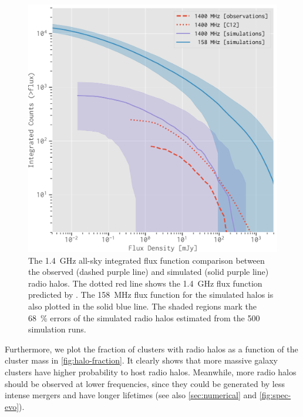 \documentclass[twocolumn]{aastex62}
\newcommand{\editone}[1]{{\leavevmode\color{cyan}#1}}
\begin{document}
\begin{figure}
  \centering
  \includegraphics[width=\columnwidth]{fluxfunc-simucomp}
  \caption{\label{fig:halos-simucomp}%
    The \SI{1.4}{\GHz} all-sky integrated flux function comparison
    between the observed (dashed purple line) and simulated
    (solid purple line) radio halos.
    The dotted red line shows the \SI{1.4}{\GHz} flux function predicted
    by \citet{cassano2012}.
    The \SI{158}{\MHz} flux function for the simulated halos is also
    plotted in the solid blue line.
    The shaded regions mark the \SI{68}{\percent} errors of the
    simulated radio halos estimated from the 500 simulation runs.
  }
\end{figure}

\editone{%
Furthermore, we plot the fraction of clusters with radio halos as a
function of the cluster mass in \autoref{fig:halo-fraction}.
It clearly shows that more massive galaxy clusters have higher probability
to host radio halos.
Meanwhile, more radio halos should be observed at lower frequencies, since
they could be generated by less intense mergers and have longer lifetimes
(see also \autoref{sec:numerical} and \autoref{fig:spec-evo}).
}
\end{document}
